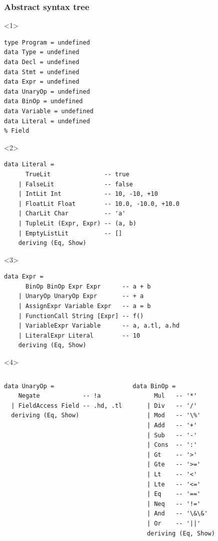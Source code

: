 \documentclass{beamer}
\begin{document}

\begin{frame}[fragile]
  \frametitle{Abstract syntax tree}
  \begin{onlyenv}<1>
    \begin{verbatim}
type Program = undefined
data Type = undefined
data Decl = undefined
data Stmt = undefined
data Expr = undefined
data UnaryOp = undefined
data BinOp = undefined
data Variable = undefined
data Literal = undefined
% Field
    \end{verbatim}
  \end{onlyenv}

\begin{onlyenv}<2>
 \begin{verbatim} 
data Literal =
      TrueLit               -- true
    | FalseLit              -- false
    | IntLit Int            -- 10, -10, +10
    | FloatLit Float        -- 10.0, -10.0, +10.0
    | CharLit Char          -- 'a'
    | TupleLit (Expr, Expr) -- (a, b)
    | EmptyListLit          -- []
    deriving (Eq, Show)
 \end{verbatim}
\end{onlyenv}

\begin{onlyenv}<3>
 \begin{verbatim}
data Expr =
      BinOp BinOp Expr Expr      -- a + b
    | UnaryOp UnaryOp Expr       -- + a
    | AssignExpr Variable Expr   -- a = b
    | FunctionCall String [Expr] -- f()
    | VariableExpr Variable      -- a, a.tl, a.hd
    | LiteralExpr Literal        -- 10
    deriving (Eq, Show) 
  \end{verbatim}
\end{onlyenv}


\begin{onlyenv}<4>

 \begin{columns}
    \begin{verbatim}
data UnaryOp = 
    Negate            -- !a
  | FieldAccess Field -- .hd, .tl
  deriving (Eq, Show)
    \end{verbatim}

  \begin{verbatim}
data BinOp =
      Mul   -- '*'
    | Div   -- '/'
    | Mod   -- '\%'
    | Add   -- '+'
    | Sub   -- '-' 
    | Cons  -- ':'
    | Gt    -- '>'
    | Gte   -- '>='
    | Lt    -- '<'
    | Lte   -- '<='
    | Eq    -- '=='
    | Neq   -- '!='
    | And   -- '\&\&'
    | Or    -- '||'
    deriving (Eq, Show)
  \end{verbatim}
\end{columns}
\end{onlyenv}


\end{frame}
\end{document}
